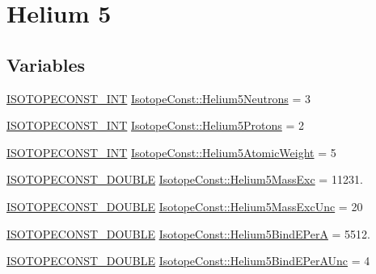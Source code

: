\hypertarget{group___isotope_const-_helium-_he5}{}\section{Helium 5}
\label{group___isotope_const-_helium-_he5}
\subsection*{Variables}
\begin{DoxyCompactItemize}
\item 
\mbox{\hyperlink{group___isotope_const-_macros_ga5f18360b3e99483a35c32d789e62621c}{I\+S\+O\+T\+O\+P\+E\+C\+O\+N\+S\+T\+\_\+\+I\+NT}} \mbox{\hyperlink{group___isotope_const-_helium-_he5_ga8d4e36bd432b0190fb4ec7d0cc839f7c}{Isotope\+Const\+::\+Helium5\+Neutrons}} = 3
\item 
\mbox{\hyperlink{group___isotope_const-_macros_ga5f18360b3e99483a35c32d789e62621c}{I\+S\+O\+T\+O\+P\+E\+C\+O\+N\+S\+T\+\_\+\+I\+NT}} \mbox{\hyperlink{group___isotope_const-_helium-_he5_gab5fb4e5da8363a0b9d59db72d2891bce}{Isotope\+Const\+::\+Helium5\+Protons}} = 2
\item 
\mbox{\hyperlink{group___isotope_const-_macros_ga5f18360b3e99483a35c32d789e62621c}{I\+S\+O\+T\+O\+P\+E\+C\+O\+N\+S\+T\+\_\+\+I\+NT}} \mbox{\hyperlink{group___isotope_const-_helium-_he5_ga91f920ef312509f1a48c2673046fe9f9}{Isotope\+Const\+::\+Helium5\+Atomic\+Weight}} = 5
\item 
\mbox{\hyperlink{group___isotope_const-_macros_ga8f45a7272ce02c0b4c65c44636ed719a}{I\+S\+O\+T\+O\+P\+E\+C\+O\+N\+S\+T\+\_\+\+D\+O\+U\+B\+LE}} \mbox{\hyperlink{group___isotope_const-_helium-_he5_gaa9054e7a2402082e151e008ce60fc99f}{Isotope\+Const\+::\+Helium5\+Mass\+Exc}} = 11231.
\item 
\mbox{\hyperlink{group___isotope_const-_macros_ga8f45a7272ce02c0b4c65c44636ed719a}{I\+S\+O\+T\+O\+P\+E\+C\+O\+N\+S\+T\+\_\+\+D\+O\+U\+B\+LE}} \mbox{\hyperlink{group___isotope_const-_helium-_he5_ga193351c7745763483c461fb7dc13897e}{Isotope\+Const\+::\+Helium5\+Mass\+Exc\+Unc}} = 20
\item 
\mbox{\hyperlink{group___isotope_const-_macros_ga8f45a7272ce02c0b4c65c44636ed719a}{I\+S\+O\+T\+O\+P\+E\+C\+O\+N\+S\+T\+\_\+\+D\+O\+U\+B\+LE}} \mbox{\hyperlink{group___isotope_const-_helium-_he5_ga3297175dd79013cdb572bd3a135480c9}{Isotope\+Const\+::\+Helium5\+Bind\+E\+PerA}} = 5512.
\item 
\mbox{\hyperlink{group___isotope_const-_macros_ga8f45a7272ce02c0b4c65c44636ed719a}{I\+S\+O\+T\+O\+P\+E\+C\+O\+N\+S\+T\+\_\+\+D\+O\+U\+B\+LE}} \mbox{\hyperlink{group___isotope_const-_helium-_he5_ga914f0b9db9f4015c16c27cef5eca5a70}{Isotope\+Const\+::\+Helium5\+Bind\+E\+Per\+A\+Unc}} = 4

\end{DoxyCompactItemize}
